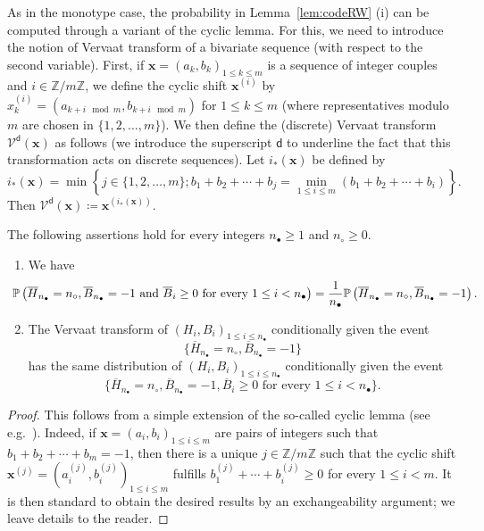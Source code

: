 \documentclass[10pt]{amsart}
\theoremstyle{definition}\newtheorem{defi}[theo]{Definition}\newtheorem{rema}[theo]{Remark}\newtheorem{exam}[theo]{Example}\newtheorem{exem}[theo]{Example}\newtheorem{nota}[theo]{Notation}
\newcommand{\Z}{\mathbb{Z}}
\def\Vcd{\mathcal{V}^{\mathsf{d}}}
\def\nc{n_{\circ}}
\def\nb{n_{\bullet}}
\def\oB{\overline{B}}
\def\oH{\overline{H}}
\renewcommand\Pr[1]{\mathbb{P}\left(#1\right)}
\begin{document}
As in the monotype case, the probability in Lemma~\ref{lem:codeRW} (i)
can be computed through a variant of the cyclic lemma.
For this, we need to introduce the notion of Vervaat transform of a bivariate sequence (with respect to the second variable).
First, if $\mathbf{x}=(a_{k},b_{k})_{1 \leq k \leq m}$ is a sequence of integer couples and $i \in \Z/m\Z$, we define the cyclic shift $\mathbf{x}^{(i)}$ by $x^{(i)}_k=(a_{k+i \mod m},b_{k+i \mod m})$ for $1 \leq k \leq m$ (where representatives modulo $m$ are chosen in $ \{1,2, \ldots,m\}$).  We then define the (discrete) Vervaat transform $ \Vcd(\mathbf{x})$ as follows (we introduce the superscript $\mathsf{d}$ to underline the fact that this transformation acts on discrete sequences). Let $i_{*}(\mathbf{x})$ be defined by
\[i_{*}(\mathbf{x}) = \min \left\{ j  \in \{1,2, \ldots,m\} ; b_{1}+b_{2}+\cdots+b_{j}= \min_{1 \leq i \leq m} (b_{1}+b_{2}+\cdots+b_{i}) \right\}.\]
Then $\Vcd(\mathbf{x}) \coloneqq \mathbf{x}^{(i_{*}(\mathbf{x}))}$.

\begin{lemma}\label{lem:vervaat}
The following assertions hold for every integers $\nb \geq 1$ and $\nc \geq 0$.
\begin{enumerate}
\item[(i)] We have
  \[\hspace{-5mm}\Pr{\oH_{\nb}=\nc, \oB_{\nb}=-1 \textrm{ and } \oB_{i} \geq 0 \textrm{ for every } 1 \leq i <\nb }= \frac{1}{\nb} \Pr{\oH_{\nb}=\nc, \oB_{\nb}=-1 }.\]
\item[(ii)] The Vervaat transform of $(H_{i},B_{i})_{1 \leq i \leq \nb}$ conditionally given the event
\[ \{\oH_{\nb}=\nc, \oB_{\nb}=-1 \}\]
has the same distribution of $(H_{i},B_{i})_{1 \leq i \leq \nb}$ conditionally given the event
\[ \{\oH_{\nb}=\nc, \oB_{\nb}=-1, \oB_{i} \geq 0 \textrm{ for every } 1 \leq i <\nb \}.\]
\end{enumerate}
\end{lemma}
\begin{proof}This follows from a simple extension of the so-called cyclic lemma (see e.g.~\cite[Lemma 6.1]{Pit06}). Indeed, if $\mathbf{x}=(a_{i},b_{i})_{1 \leq i \leq m}$ are pairs of integers such that $b_{1}+b_{2}+\cdots+b_{m}=-1$, then there is a unique $j \in \Z/m\Z$ such that the cyclic shift $\mathbf{x}^{(j)}=(a^{(j)}_{i},b^{(j)}_{i})_{1 \leq i \leq m}$ fulfills $b^{(j)}_{1}+ \cdots +b^{(j)}_{i} \geq 0$ for every $1 \leq i<m$. It is then standard to obtain the desired results by an exchangeability argument; we leave details to the reader.
\end{proof}
\end{document}
